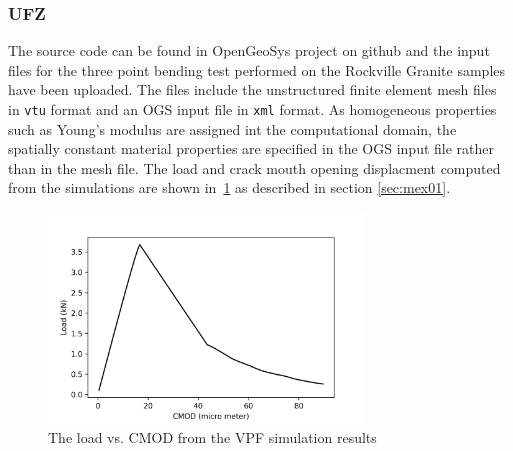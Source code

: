 \subsubsection*{UFZ}
The source code can be found in OpenGeoSys project on github and  the input files for the three point bending test performed on the Rockville Granite samples have been uploaded.
The files include the unstructured finite element mesh files in \texttt{vtu} format and an OGS input file in \texttt{xml} format.
As homogeneous properties such as Young's modulus are assigned int the computational domain, the spatially constant material properties are specified in the OGS input file rather than in the mesh file.
The load and crack mouth opening displacment computed from the simulations are shown in~\ref{fig:Keita_ME1_VPF_Rockville} as described in section \ref {sec:mex01}.

\begin{figure}[!ht]
\centering
\includegraphics[width=0.75\textwidth]{figures/VPF_ME1_NF_CMOD.png}
\caption{The load vs. CMOD from the VPF simulation results}
\label{fig:Keita_ME1_VPF_Rockville}
\end{figure}

